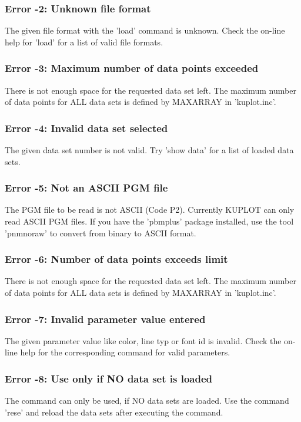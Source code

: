 \subsubsection{Error -2: Unknown file format}
\par
The given file format with the 'load' command is unknown. Check 
the on-line help for 'load' for a list of valid file formats. 
\subsubsection{Error -3: Maximum number of data points exceeded}
\par
There is not enough space for the requested data set left. The 
maximum number of data points for ALL data sets is defined by 
MAXARRAY in 'kuplot.inc'. 
\subsubsection{Error -4: Invalid data set selected}
\par
The given data set number is not valid. Try 'show data' for a 
list of loaded data sets. 
\subsubsection{Error -5: Not an ASCII PGM file}
\par
The PGM file to be read is not ASCII (Code P2). Currently KUPLOT 
can only read ASCII PGM files. If you have the 'pbmplus' package 
installed, use the tool 'pnmnoraw' to convert from binary to ASCII 
format. 
\subsubsection{Error -6: Number of data points exceeds limit}
\par
There is not enough space for the requested data set left. The 
maximum number of data points for ALL data sets is defined by 
MAXARRAY in 'kuplot.inc'. 
\subsubsection{Error -7: Invalid parameter value entered}
\par
The given parameter value like color, line typ or font id is invalid. 
Check the on-line help for the corresponding command for valid 
parameters. 
\subsubsection{Error -8: Use only if NO data set is loaded}
\par
The command can only be used, if NO data sets are loaded. Use the 
command 'rese' and reload the data sets after executing the command. 
